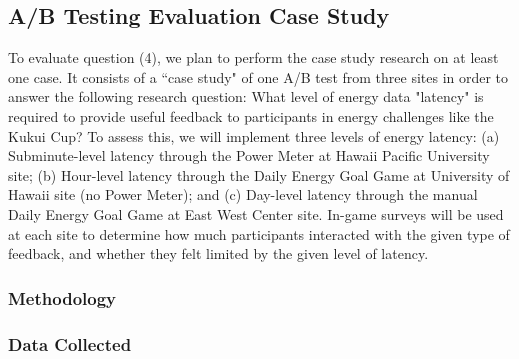 \documentclass[11pt]{article}
\begin{document}
\subsection{A/B Testing Evaluation Case Study}
To evaluate question (4), we plan to perform the case study research on at least one case. It consists of a ``case study" of one A/B test from three sites in order to answer the following research question: What level of energy data "latency" is required to provide useful feedback to participants in energy challenges like the Kukui Cup?  To assess this, we will implement three levels of energy latency:  (a) Subminute-level latency through the Power Meter at Hawaii Pacific University site; (b) Hour-level latency through the Daily Energy Goal Game at University of Hawaii site (no Power Meter); and (c) Day-level latency through the manual Daily Energy Goal Game at East West Center site.  In-game surveys will  be used at each site to determine how much participants interacted with the given type of feedback, and whether they felt limited by the given level of latency.

\subsubsection{Methodology}

\subsubsection{Data Collected}
  
\end{document}
